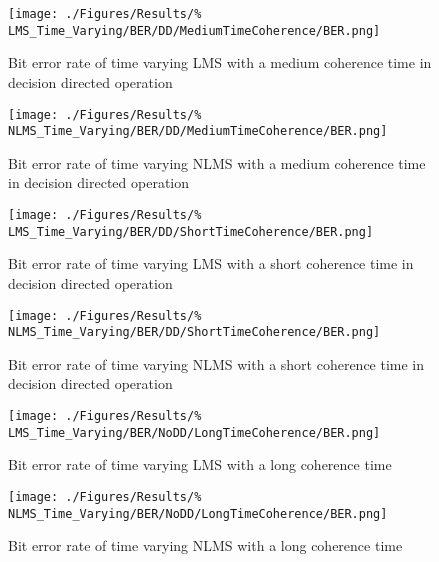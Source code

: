 \begin{figure}[ht]
	\centering
	\begin{minipage}{0.49\textwidth}
		\centering
		\texttt{[image: ./Figures/Results/\%
	LMS\_Time\_Varying/BER/DD/MediumTimeCoherence/BER.png]}
		\captionsetup{width=0.75\linewidth}
		\caption{Bit error rate of time varying LMS with a 
		medium coherence time in decision directed 
		operation}
	\end{minipage}
	\begin{minipage}{0.49\textwidth}
		\centering
		\texttt{[image: ./Figures/Results/\%
	NLMS\_Time\_Varying/BER/DD/MediumTimeCoherence/BER.png]}
		\captionsetup{width=0.75\linewidth}
		\caption{Bit error rate of time varying NLMS with a 
		medium coherence time in decision directed operation}
	\end{minipage}
\end{figure}

\begin{figure}[ht]
	\centering
	\begin{minipage}{0.49\textwidth}
		\centering
		\texttt{[image: ./Figures/Results/\%
	LMS\_Time\_Varying/BER/DD/ShortTimeCoherence/BER.png]}
		\captionsetup{width=0.75\linewidth}
		\caption{Bit error rate of time varying LMS with a 
		short coherence time in decision directed operation}
	\end{minipage}
	\begin{minipage}{0.49\textwidth}
		\centering
		\texttt{[image: ./Figures/Results/\%
	NLMS\_Time\_Varying/BER/DD/ShortTimeCoherence/BER.png]}
		\captionsetup{width=0.75\linewidth}
		\caption{Bit error rate of time varying NLMS with a 
		short coherence time in decision directed operation}
	\end{minipage}
\end{figure}

\begin{figure}[ht]
	\centering
	\begin{minipage}{0.49\textwidth}
		\centering
		\texttt{[image: ./Figures/Results/\%
	LMS\_Time\_Varying/BER/NoDD/LongTimeCoherence/BER.png]}
		\captionsetup{width=0.75\linewidth}
		\caption{Bit error rate of time varying LMS with a 
		long coherence time}
	\end{minipage}
	\begin{minipage}{0.49\textwidth}
		\centering
		\texttt{[image: ./Figures/Results/\%
	NLMS\_Time\_Varying/BER/NoDD/LongTimeCoherence/BER.png]}
		\captionsetup{width=0.75\linewidth}
		\caption{Bit error rate of time varying NLMS with a 
		long coherence time}
	\end{minipage}
\end{figure}

